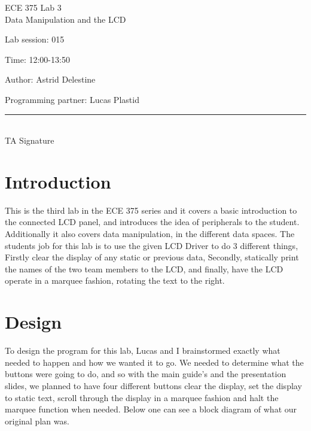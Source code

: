 \documentclass[12pt,letterpaper]{article}
\begin{document}
\begin{titlepage}
    \vspace*{4cm}
    \begin{flushright}
    {\huge
        ECE 375 Lab 3\\[1cm]
    }
    {\large
       Data Manipulation and the LCD
    }
    \end{flushright}
    \begin{flushleft}
    Lab session: 015
    
    Time: 12:00-13:50
    \end{flushleft}
    \begin{flushright}
    Author: Astrid Delestine

    Programming partner: Lucas Plastid 

    \vfill
    \rule{5in}{.5mm}\\
    TA Signature
    \end{flushright}

\end{titlepage}

\section{Introduction}
This is the third lab in the ECE 375 series and it covers a basic introduction to the connected LCD panel, and introduces the idea of peripherals to the student. Additionally it also covers data manipulation, in the different data spaces. The students job for this lab is to use the given LCD Driver to do 3 different things, Firstly clear the display of any static or previous data, Secondly, statically print the names of the two team members to the LCD, and finally, have the LCD operate in a marquee fashion, rotating the text to the right. 

\section{Design}
To design the program for this lab, Lucas and I brainstormed exactly what needed to happen and how we wanted it to go. We needed to determine what the buttons were going to do, and so with the main guide's and the presentation slides, we planned to have four different buttons clear the display, set the display to static text, scroll through the display in a marquee fashion and halt the marquee function when needed. Below one can see a block diagram of what our original plan was.
\end{document}
